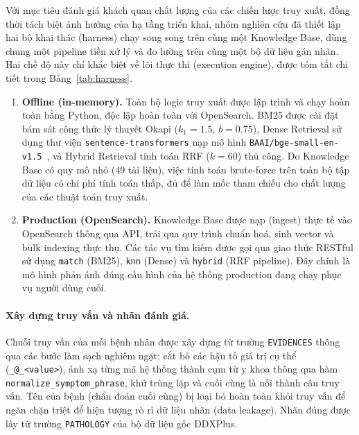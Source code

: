 Với mục tiêu đánh giá khách quan chất lượng của các chiến lược truy xuất, đồng thời tách biệt ảnh hưởng của hạ tầng triển khai, nhóm nghiên cứu đã thiết lập hai bộ khai thác (harness) chạy song song trên cùng một Knowledge Base, dùng chung một pipeline tiền xử lý và đo lường trên cùng một bộ dữ liệu gán nhãn. Hai chế độ này chỉ khác biệt về lõi thực thi (execution engine), được tóm tắt chi tiết trong Bảng~\ref{tab:harness}.

\begin{enumerate}[leftmargin=1.4em,itemsep=2pt]
    \item \textbf{Offline (in-memory).} Toàn bộ logic truy xuất được lập trình và chạy hoàn toàn bằng Python, độc lập hoàn toàn với OpenSearch. BM25 được cài đặt bám sát công thức lý thuyết Okapi ($k_1=1.5$, $b=0.75$), Dense Retrieval sử dụng thư viện \texttt{sentence-transformers} nạp mô hình \texttt{BAAI/bge-small-en-v1.5}~\cite{xiao2024cpack}, và Hybrid Retrieval tính toán RRF ($k=60$) thủ công. Do Knowledge Base có quy mô nhỏ (49 tài liệu), việc tính toán brute-force trên toàn bộ tập dữ liệu có chi phí tính toán thấp, đủ để làm mốc tham chiếu cho chất lượng của các thuật toán truy xuất.
    \item \textbf{Production (OpenSearch).} Knowledge Base được nạp (ingest) thực tế vào OpenSearch thông qua API, trải qua quy trình chuẩn hoá, sinh vector và bulk indexing thực thụ. Các tác vụ tìm kiếm được gọi qua giao thức RESTful sử dụng \texttt{match} (BM25), \texttt{knn} (Dense) và \texttt{hybrid} (RRF pipeline). Đây chính là mô hình phản ánh đúng cấu hình của hệ thống production đang chạy phục vụ người dùng cuối.
\end{enumerate}

\paragraph{Xây dựng truy vấn và nhãn đánh giá.}
Chuỗi truy vấn của mỗi bệnh nhân được xây dựng từ trường \texttt{EVIDENCES} thông qua các bước làm sạch nghiêm ngặt: cắt bỏ các hậu tố giá trị cụ thể (\texttt{\_@\_<value>}), ánh xạ từng mã hệ thống thành cụm từ y khoa thông qua hàm \texttt{normalize\_symptom\_phrase}, khử trùng lặp và cuối cùng là nối thành câu truy vấn. Tên của bệnh (chẩn đoán cuối cùng) bị loại bỏ hoàn toàn khỏi truy vấn để ngăn chặn triệt để hiện tượng rò rỉ dữ liệu nhãn (data leakage). Nhãn đúng được lấy từ trường \texttt{PATHOLOGY} của bộ dữ liệu gốc DDXPlus.

